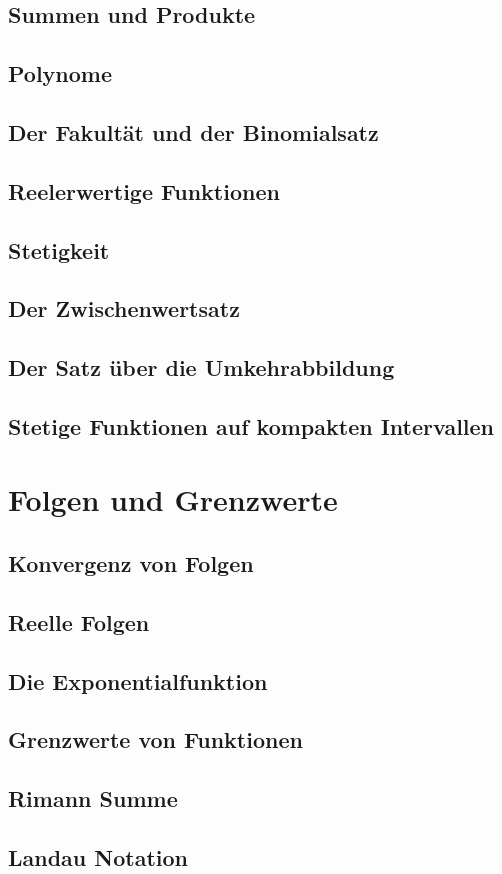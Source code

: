 \documentclass[12pt, twoside, openright]{report}
\theoremstyle{definition} %
\theoremstyle{definition} %
\theoremstyle{definition} %
\theoremstyle{definition} %
\theoremstyle{definition} %
\theoremstyle{remark} %
\begin{document}
		\section{Summen und Produkte}
		
		
		\section{Polynome}
		
		
		\section{Der Fakultät und der Binomialsatz}
		
		
		\section{Reelerwertige Funktionen}
		
		
		\section{Stetigkeit}
		
		
		\section{Der Zwischenwertsatz}
		
	
		\section{Der Satz über die Umkehrabbildung}
		
		
		\section{Stetige Funktionen auf kompakten Intervallen}
		
		
	\chapter{Folgen und Grenzwerte}
		\section{Konvergenz von Folgen}
		
		
		\section{Reelle Folgen}
		\section{Die Exponentialfunktion}
		\section{Grenzwerte von Funktionen}
		\section{Rimann Summe}
		\section{Landau Notation}
		
\end{document}
